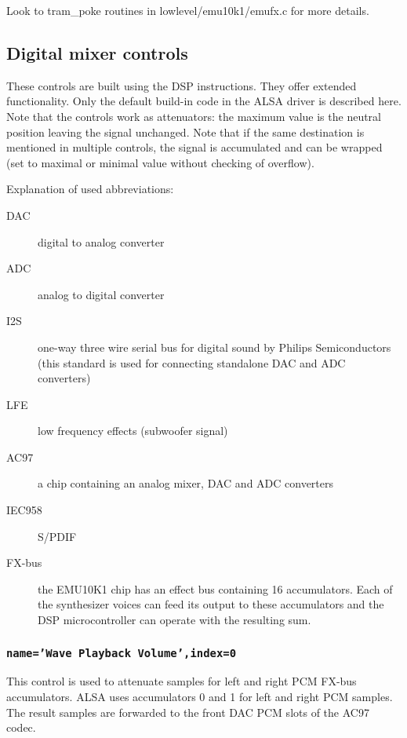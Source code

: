 \documentclass[a4paper,8pt,english]{sphinxmanual}
\begin{document}
Look to tram\_poke routines in lowlevel/emu10k1/emufx.c for more details.


\subsection{Digital mixer controls}
\label{sound/cards/sb-live-mixer:digital-mixer-controls}
These controls are built using the DSP instructions. They offer extended
functionality. Only the default build-in code in the ALSA driver is described
here. Note that the controls work as attenuators: the maximum value is the
neutral position leaving the signal unchanged. Note that if the  same destination
is mentioned in multiple controls, the signal is accumulated and can be wrapped
(set to maximal or minimal value without checking of overflow).

Explanation of used abbreviations:
\begin{description}
\item[{DAC}] \leavevmode
digital to analog converter

\item[{ADC}] \leavevmode
analog to digital converter

\item[{I2S}] \leavevmode
one-way three wire serial bus for digital sound by Philips Semiconductors
(this standard is used for connecting standalone DAC and ADC converters)

\item[{LFE}] \leavevmode
low frequency effects (subwoofer signal)

\item[{AC97}] \leavevmode
a chip containing an analog mixer, DAC and ADC converters

\item[{IEC958}] \leavevmode
S/PDIF

\item[{FX-bus}] \leavevmode
the EMU10K1 chip has an effect bus containing 16 accumulators.
Each of the synthesizer voices can feed its output to these accumulators
and the DSP microcontroller can operate with the resulting sum.

\end{description}


\subsubsection{\texttt{name='Wave Playback Volume',index=0}}
\label{sound/cards/sb-live-mixer:name-wave-playback-volume-index-0}
This control is used to attenuate samples for left and right PCM FX-bus
accumulators. ALSA uses accumulators 0 and 1 for left and right PCM samples.
The result samples are forwarded to the front DAC PCM slots of the AC97 codec.
\end{document}
